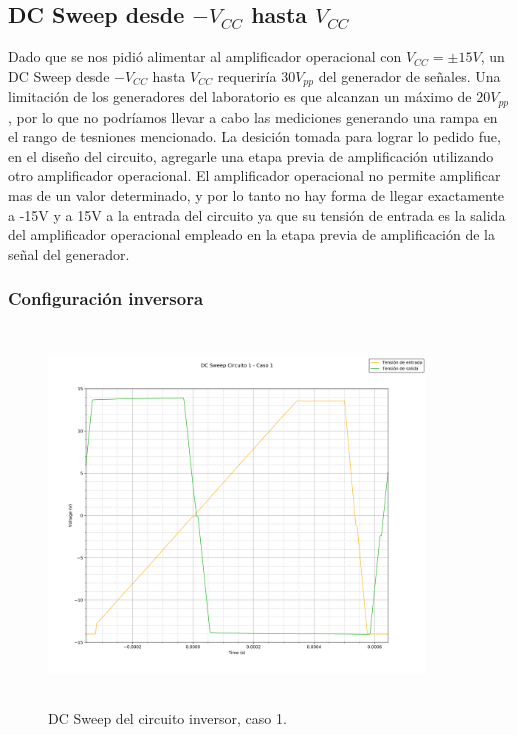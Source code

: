 \subsection{DC Sweep desde $-V_{CC}$ hasta $V_{CC}$}
Dado que se nos pidi\'o alimentar al amplificador operacional con $V_{CC} = \pm 15V$, un DC Sweep desde $-V_{CC}$ hasta $V_{CC}$ requerir\'ia $30V_{pp}$ del generador de se\~nales. Una limitaci\'on de los generadores del laboratorio es que alcanzan un m\'aximo de $20V_{pp}$, por lo que no podr\'iamos llevar a cabo las mediciones generando una rampa en el rango de tesniones mencionado. La desici\'on tomada para lograr lo pedido fue, en el dise\~no del circuito, agregarle una etapa previa de amplificaci\'on utilizando otro amplificador operacional. 
El amplificador operacional no permite amplificar mas de un valor determinado, y por lo tanto no hay forma de llegar exactamente a -15V y a 15V a la entrada del circuito ya que su tensi\'on de entrada es la salida del amplificador operacional empleado en la etapa previa de amplificaci\'on de la se\~nal del generador.

\subsubsection*{Configuraci\'on inversora} %

\begin{figure}[H] %
	\centering
	\includegraphics[width=10cm,height=10cm,keepaspectratio]{../EJ1/00GRAFICOS/c1dcs/c1c1dcs.png}
	\caption{DC Sweep del circuito inversor, caso 1.}
	\label{c1c1dcs}
\end{figure}

